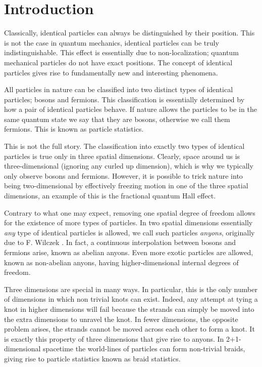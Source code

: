 
\chapter{Introduction}

Classically, identical particles can always be distinguished by their position. This is not the case in quantum mechanics, identical particles can be truly indistinguishable. This effect is essentially due to non-localization; quantum mechanical particles do not have exact positions. The concept of identical particles gives rise to fundamentally new and interesting phenomena.

All particles in nature can be classified into two distinct types of identical particles; bosons and fermions.
This classification is essentially determined by how a pair of identical particles behave. If nature allows the particles to be in the same quantum state we say that they are bosons, otherwise we call them fermions. This is known as particle statistics.

This is not the full story. The classification into exactly two types of identical particles is true only in three spatial dimensions. Clearly, space around us is three-dimensional (ignoring any curled up dimension), which is why we typically only observe bosons and fermions. However, it is possible to trick nature into being two-dimensional by effectively freezing motion in one of the three spatial dimensions, an example of this is the fractional quantum Hall effect.

Contrary to what one may expect, removing one spatial degree of freedom allows for the existence of more types of particles. In two spatial dimensions essentially \emph{any} type of identical particles is allowed, we call such particles \emph{anyons}, originally due to F. Wilczek \cite{wilczek}. In fact, a continuous interpolation between bosons and fermions arise, known as abelian anyons. Even more exotic particles are allowed, known as non-abelian anyons, having higher-dimensional internal degrees of freedom.

Three dimensions are special in many ways. In particular, this is the only number of dimensions in which non trivial knots can exist. Indeed, any attempt at tying a knot in higher dimensions will fail because the strands can simply be moved into the extra dimensions to unravel the knot. In fewer dimensions, the opposite problem arises, the strands cannot be moved across each other to form a knot. It is exactly this property of three dimensions that give rise to anyons. In 2+1-dimensional spacetime the world-lines of particles can form non-trivial braids, giving rise to particle statistics known as braid statistics.

